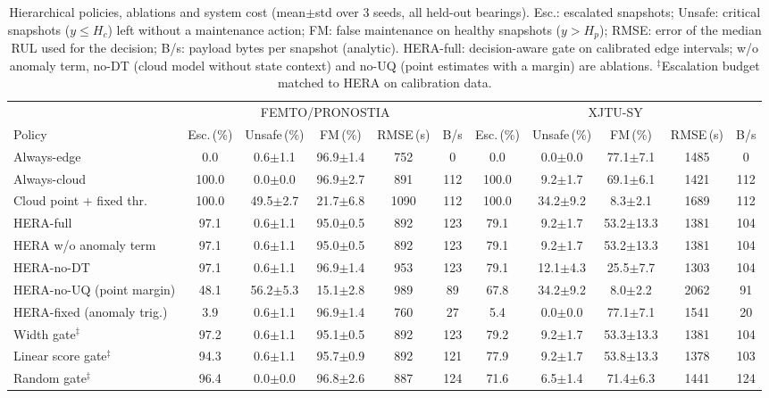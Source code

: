 \begin{table}[t]
\centering
\caption{Hierarchical policies, ablations and system cost (mean$\pm$std over 3 seeds, all held-out bearings). Esc.: escalated snapshots; Unsafe: critical snapshots ($y{\le}H_c$) left without a maintenance action; FM: false maintenance on healthy snapshots ($y{>}H_p$); RMSE: error of the median RUL used for the decision; B/s: payload bytes per snapshot (analytic). HERA-full: decision-aware gate on calibrated edge intervals; w/o anomaly term, no-DT (cloud model without state context) and no-UQ (point estimates with a margin) are ablations. $^\ddagger$Escalation budget matched to HERA on calibration data.}
\label{tab:policies}
\setlength{\tabcolsep}{3.4pt}\footnotesize
\begin{tabular}{l|ccccc|ccccc}
\toprule
 & \multicolumn{5}{c|}{FEMTO/PRONOSTIA} & \multicolumn{5}{c}{XJTU-SY} \\
Policy & Esc.\,(\%) & Unsafe\,(\%) & FM\,(\%) & RMSE\,(s) & B/s & Esc.\,(\%) & Unsafe\,(\%) & FM\,(\%) & RMSE\,(s) & B/s \\
\midrule
Always-edge & 0.0 & 0.6$\pm$1.1 & 96.9$\pm$1.4 & 752 & 0 & 0.0 & 0.0$\pm$0.0 & 77.1$\pm$7.1 & 1485 & 0 \\
Always-cloud & 100.0 & 0.0$\pm$0.0 & 96.9$\pm$2.7 & 891 & 112 & 100.0 & 9.2$\pm$1.7 & 69.1$\pm$6.1 & 1421 & 112 \\
Cloud point + fixed thr. & 100.0 & 49.5$\pm$2.7 & 21.7$\pm$6.8 & 1090 & 112 & 100.0 & 34.2$\pm$9.2 & 8.3$\pm$2.1 & 1689 & 112 \\
\midrule
HERA-full & 97.1 & 0.6$\pm$1.1 & 95.0$\pm$0.5 & 892 & 123 & 79.1 & 9.2$\pm$1.7 & 53.2$\pm$13.3 & 1381 & 104 \\
HERA w/o anomaly term & 97.1 & 0.6$\pm$1.1 & 95.0$\pm$0.5 & 892 & 123 & 79.1 & 9.2$\pm$1.7 & 53.2$\pm$13.3 & 1381 & 104 \\
HERA-no-DT & 97.1 & 0.6$\pm$1.1 & 96.9$\pm$1.4 & 953 & 123 & 79.1 & 12.1$\pm$4.3 & 25.5$\pm$7.7 & 1303 & 104 \\
\midrule
HERA-no-UQ (point margin) & 48.1 & 56.2$\pm$5.3 & 15.1$\pm$2.8 & 989 & 89 & 67.8 & 34.2$\pm$9.2 & 8.0$\pm$2.2 & 2062 & 91 \\
HERA-fixed (anomaly trig.) & 3.9 & 0.6$\pm$1.1 & 96.9$\pm$1.4 & 760 & 27 & 5.4 & 0.0$\pm$0.0 & 77.1$\pm$7.1 & 1541 & 20 \\
\midrule
Width gate$^\ddagger$ & 97.2 & 0.6$\pm$1.1 & 95.1$\pm$0.5 & 892 & 123 & 79.2 & 9.2$\pm$1.7 & 53.3$\pm$13.3 & 1381 & 104 \\
Linear score gate$^\ddagger$ & 94.3 & 0.6$\pm$1.1 & 95.7$\pm$0.9 & 892 & 121 & 77.9 & 9.2$\pm$1.7 & 53.8$\pm$13.3 & 1378 & 103 \\
Random gate$^\ddagger$ & 96.4 & 0.0$\pm$0.0 & 96.8$\pm$2.6 & 887 & 124 & 71.6 & 6.5$\pm$1.4 & 71.4$\pm$6.3 & 1441 & 124 \\
\bottomrule
\end{tabular}
\end{table}
